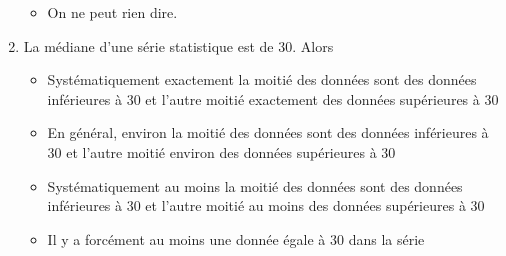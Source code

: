 \begin{exo}[8 points]
\begin{enumerate}
\begin{itemize}
			\item On ne peut rien dire.
		\end{itemize}%
  \item La m\'ediane d'une s\'erie statistique est de 30. Alors
    \renewcommand{\labelitemi}{$\square$}
		\begin{itemize}
			\item Syst\'ematiquement exactement la moiti\'e des donn\'ees sont des donn\'ees inf\'erieures \`a 30 et l'autre moiti\'e exactement des donn\'ees sup\'erieures \`a 30 %
			\item En g\'en\'eral, environ la moiti\'e des donn\'ees sont des donn\'ees inf\'erieures \`a 30 et l'autre moiti\'e environ des donn\'ees sup\'erieures \`a 30 %
			\item Syst\'ematiquement au moins la moiti\'e des donn\'ees sont des donn\'ees inf\'erieures \`a 30 et l'autre moiti\'e au moins des donn\'ees sup\'erieures \`a 30
			\item Il y a forc\'ement au moins une donn\'ee \'egale \`a 30 dans la s\'erie
		\end{itemize}%
\end{enumerate}

\end{exo}








\setcounter{chapter}{\thechaptertemp} %
